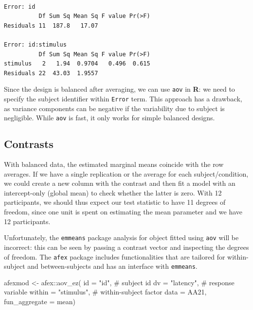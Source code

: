 \documentclass[
  11pt,
  letterpaper,
]{scrbook}
\newenvironment{Shaded}{\begin{snugshade}}{\end{snugshade}}
\newcommand{\AttributeTok}[1]{\textcolor[rgb]{0.40,0.45,0.13}{#1}}
\newcommand{\CommentTok}[1]{\textcolor[rgb]{0.37,0.37,0.37}{#1}}
\newcommand{\FunctionTok}[1]{\textcolor[rgb]{0.28,0.35,0.67}{#1}}
\newcommand{\NormalTok}[1]{\textcolor[rgb]{0.00,0.23,0.31}{#1}}
\newcommand{\OtherTok}[1]{\textcolor[rgb]{0.00,0.23,0.31}{#1}}
\newcommand{\SpecialCharTok}[1]{\textcolor[rgb]{0.37,0.37,0.37}{#1}}
\newcommand{\StringTok}[1]{\textcolor[rgb]{0.13,0.47,0.30}{#1}}
\theoremstyle{definition}
\theoremstyle{remark}
\begin{document}
\begin{verbatim}

Error: id
          Df Sum Sq Mean Sq F value Pr(>F)
Residuals 11  187.8   17.07               

Error: id:stimulus
          Df Sum Sq Mean Sq F value Pr(>F)
stimulus   2   1.94  0.9704   0.496  0.615
Residuals 22  43.03  1.9557               
\end{verbatim}

Since the design is balanced after averaging, we can use \texttt{aov} in
\textbf{R}: we need to specify the subject identifier within
\texttt{Error} term. This approach has a drawback, as variance
components can be negative if the variability due to subject is
negligible. While \texttt{aov} is fast, it only works for simple
balanced designs.

\hypertarget{contrasts-1}{%
\subsection{Contrasts}\label{contrasts-1}}

With balanced data, the estimated marginal means coincide with the row
averages. If we have a single replication or the average for each
subject/condition, we could create a new column with the contrast and
then fit a model with an intercept-only (global mean) to check whether
the latter is zero. With 12 participants, we should thus expect our test
statistic to have 11 degrees of freedom, since one unit is spent on
estimating the mean parameter and we have 12 participants.

Unfortunately, the \texttt{emmeans} package analysis for object fitted
using \texttt{aov} will be incorrect: this can be seen by passing a
contrast vector and inspecting the degrees of freedom. The \texttt{afex}
package includes functionalities that are tailored for within-subject
and between-subjects and has an interface with \texttt{emmeans}.

\begin{Shaded}
\begin{Highlighting}[]
\NormalTok{afexmod }\OtherTok{\textless{}{-}}\NormalTok{ afex}\SpecialCharTok{::}\FunctionTok{aov\_ez}\NormalTok{(}
  \AttributeTok{id =} \StringTok{"id"}\NormalTok{,           }\CommentTok{\# subject id}
  \AttributeTok{dv =} \StringTok{"latency"}\NormalTok{,      }\CommentTok{\# response variable}
  \AttributeTok{within =} \StringTok{"stimulus"}\NormalTok{, }\CommentTok{\# within{-}subject factor}
  \AttributeTok{data =}\NormalTok{ AA21,}
  \AttributeTok{fun\_aggregate =}\NormalTok{ mean)}
\end{Highlighting}
\end{Shaded}
\end{document}
